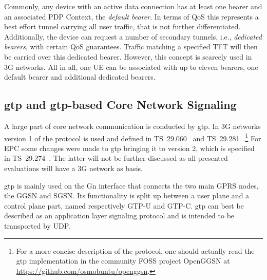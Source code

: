 Commonly, any device with an active data connection has at least one bearer and an associated \gls{PDP} Context, the \textit{default bearer}. In terms of \gls{QoS} this represents a best effort tunnel carrying all user traffic, that is not further differentiated. Additionally, the device can request a number of secondary tunnels, i.e., \textit{dedicated bearers}, with certain \gls{QoS} guarantees. Traffic matching a specified \gls{TFT} will then be carried over this dedicated bearer. However, this concept is scarcely used in \gls{3G} networks. All in all, one \gls{UE} can be associated with up to eleven bearers, one default bearer and additional dedicated bearers.


\subsection{\texorpdfstring{\acrshort{gtp}}{GTP} and \texorpdfstring{\acrshort{gtp}}{GTP}-based Core Network Signaling}
\label{c4:sec:gtp}

A large part of core network communication is conducted by \gls{gtp}. In \gls{3G} networks version 1 of the protocol is used and defined in \gls{TS}~29.060~\cite{3gpp.29.060} and \gls{TS}~29.281~\cite{3gpp.29.281}.\footnote{For a more concise description of the protocol, one should actually read the \gls{gtp} implementation in the community \gls{FOSS} project OpenGGSN at \url{https://github.com/osmobuntu/openggsn}.} For \gls{EPC} some changes were made to \gls{gtp} bringing it to version 2, which is specified in \gls{TS}~29.274~\cite{3gpp.29.274}. The latter will not be further discussed as all presented evaluations will have a \gls{3G} network as basis.

\gls{gtp} is mainly used on the Gn interface that connects the two main \gls{GPRS} nodes, the \gls{GGSN} and \gls{SGSN}. Its functionality is split up between a user plane and a control plane part, named respectively \gls{GTP-U} and \gls{GTP-C}. \gls{gtp} can best be described as an application layer signaling protocol and is intended to be transported by \gls{UDP}.


